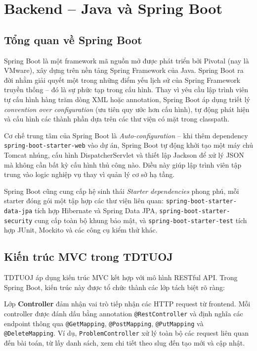 \documentclass[12pt, a4paper]{report}
\begin{document}
\section{Backend -- Java và Spring Boot}

\subsection{Tổng quan về Spring Boot}

Spring Boot là một framework mã nguồn mở được phát triển bởi Pivotal (nay là VMware), xây dựng trên nền tảng Spring Framework của Java. Spring Boot ra đời nhằm giải quyết một trong những điểm yếu lịch sử của Spring Framework truyền thống -- đó là sự phức tạp trong cấu hình. Thay vì yêu cầu lập trình viên tự cấu hình hàng trăm dòng XML hoặc annotation, Spring Boot áp dụng triết lý \textit{convention over configuration} (ưu tiên quy ước hơn cấu hình), tự động phát hiện và cấu hình các thành phần dựa trên các thư viện có mặt trong classpath.

Cơ chế trung tâm của Spring Boot là \textit{Auto-configuration} -- khi thêm dependency \texttt{spring-boot-starter-web} vào dự án, Spring Boot tự động khởi tạo một máy chủ Tomcat nhúng, cấu hình DispatcherServlet và thiết lập Jackson để xử lý JSON mà không cần bất kỳ cấu hình thủ công nào. Điều này giúp lập trình viên tập trung vào logic nghiệp vụ thay vì quản lý cơ sở hạ tầng.

Spring Boot cũng cung cấp hệ sinh thái \textit{Starter dependencies} phong phú, mỗi starter đóng gói một tập hợp các thư viện liên quan: \texttt{spring-boot-starter-data-jpa} tích hợp Hibernate và Spring Data JPA, \texttt{spring-boot-starter-security} cung cấp toàn bộ khung bảo mật, và \texttt{spring-boot-starter-test} tích hợp JUnit, Mockito và các công cụ kiểm thử khác.

\subsection{Kiến trúc MVC trong TDTUOJ}

TDTUOJ áp dụng kiến trúc \ac{MVC} kết hợp với mô hình \ac{REST}ful \ac{API}. Trong Spring Boot, kiến trúc này được tổ chức thành các lớp tách biệt rõ ràng:

Lớp \textbf{Controller} đảm nhận vai trò tiếp nhận các \ac{HTTP} request từ frontend. Mỗi controller được đánh dấu bằng annotation \texttt{@RestController} và định nghĩa các endpoint thông qua \texttt{@GetMapping}, \texttt{@PostMapping}, \texttt{@PutMapping} và \texttt{@DeleteMapping}. Ví dụ, \texttt{ProblemController} xử lý toàn bộ các request liên quan đến bài toán, từ lấy danh sách, xem chi tiết theo slug đến tạo mới và cập nhật.
\end{document}
